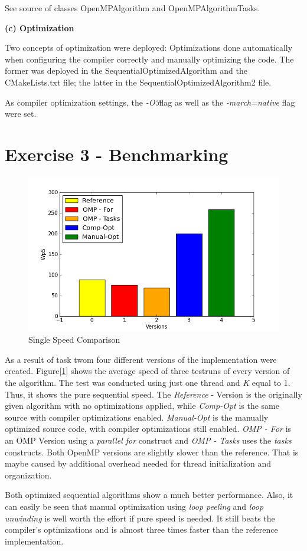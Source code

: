 \documentclass[a4paper,twoside,11pt]{article}
\begin{document}
See source of classes OpenMPAlgorithm and OpenMPAlgorithmTasks.

\textbf{(c) Optimization}

Two concepts of optimization were deployed: Optimizations done automatically when configuring the compiler correctly and manually optimizing the code. The former was deployed in the  SequentialOptimizedAlgorithm and the CMakeLists.txt file; the latter in the SequentialOptimizedAlgorithm2 file.

As compiler optimization settings, the \textit{-O3}flag as well as the \textit{-march=native} flag were set.

\section{Exercise 3 - Benchmarking}

\begin{figure}[hbtp]
\caption{Single Speed Comparison}
\centering
\label{fig:seq_comp}
\includegraphics[scale=0.8]{seq.png}
\end{figure}

As a result of task twom four different versions of the implementation were created. 
Figure[\ref{fig:seq_comp}] shows the average speed of three testruns of every version of the algorithm. The test was conducted using just one thread and \textit{K} equal to 1. Thus, it shows the pure sequential speed.
The \textit{Reference} - Version is the originally given  algorithm with no optimizations applied, while \textit{Comp-Opt} is the same source with compiler optimizations enabled. \textit{Manual-Opt} is the manually optimized source code, with compiler optimizations still enabled.
\textit{OMP - For } is an OMP Version using a \textit{parallel for} construct and \textit{OMP - Tasks} uses the \textit{tasks} constructs.
Both OpenMP versions are slightly slower than the reference. That is maybe caused by additional overhead needed for thread initialization and  organization.

Both optimized sequential algorithms show a much better performance. Also, it can easily be seen that manual optimization using \textit{loop peeling} and \textit{loop unwinding} is well worth the effort if pure speed is needed. It still beats the compiler's optimizations and is almost three times faster than the reference implementation.
\end{document}
